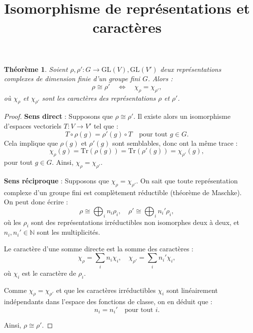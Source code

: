 \documentclass[12pt]{article}
\title{Isomorphisme de représentations et caractères}
\author{}
\date{}
\newtheorem{theoreme}{Théorème}
\begin{document}
	
	\maketitle
	
	\begin{theoreme}
		Soient \( \rho, \rho' : G \to \mathrm{GL}(V), \mathrm{GL}(V') \) deux représentations complexes de dimension finie d’un groupe fini \( G \). Alors :
		\[
		\rho \cong \rho' \quad \Leftrightarrow \quad \chi_\rho = \chi_{\rho'},
		\]
		où \( \chi_\rho \) et \( \chi_{\rho'} \) sont les caractères des représentations \( \rho \) et \( \rho' \).
	\end{theoreme}
	
	\begin{proof}
		\textbf{Sens direct} : Supposons que \( \rho \cong \rho' \). Il existe alors un isomorphisme d’espaces vectoriels \( T : V \to V' \) tel que :
		\[
		T \circ \rho(g) = \rho'(g) \circ T \quad \text{pour tout } g \in G.
		\]
		Cela implique que \( \rho(g) \) et \( \rho'(g) \) sont semblables, donc ont la même trace :
		\[
		\chi_\rho(g) = \mathrm{Tr}(\rho(g)) = \mathrm{Tr}(\rho'(g)) = \chi_{\rho'}(g),
		\]
		pour tout \( g \in G \). Ainsi, \( \chi_\rho = \chi_{\rho'} \).
		
		\vspace{1em}
		\textbf{Sens réciproque} : Supposons que \( \chi_\rho = \chi_{\rho'} \). On sait que toute représentation complexe d’un groupe fini est complètement réductible (théorème de Maschke). On peut donc écrire :
		\[
		\rho \cong \bigoplus_{i} n_i \rho_i, \quad \rho' \cong \bigoplus_{i} n_i' \rho_i,
		\]
		où les \( \rho_i \) sont des représentations irréductibles non isomorphes deux à deux, et \( n_i, n_i' \in \mathbb{N} \) sont les multiplicités.
		
		Le caractère d’une somme directe est la somme des caractères :
		\[
		\chi_\rho = \sum_i n_i \chi_i, \quad \chi_{\rho'} = \sum_i n_i' \chi_i,
		\]
		où \( \chi_i \) est le caractère de \( \rho_i \).
		
		Comme \( \chi_\rho = \chi_{\rho'} \) et que les caractères irréductibles \( \chi_i \) sont linéairement indépendants dans l’espace des fonctions de classe, on en déduit que :
		\[
		n_i = n_i' \quad \text{pour tout } i.
		\]
		
		Ainsi, \( \rho \cong \rho' \).
		
	\end{proof}
	
\end{document}
